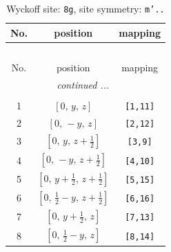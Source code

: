 \documentclass[fleqn,8pt]{jsarticle}
\begin{document}
\begin{longtable}{ccc}
\caption{Wyckoff site: {\tt 8g}, site symmetry: {\tt m'..}}
 \\
 \hline \hline
No. & position & mapping \\ \hline \endfirsthead

\multicolumn{2}{l}{\tablename\ \thetable{}} \\
 \hline \hline
No. & position & mapping \\ \hline \endhead

 \hline \hline
\multicolumn{2}{r}{\footnotesize\it continued ...} \\ \endfoot

 \hline \hline
\multicolumn{2}{r}{} \\ \endlastfoot

1 & $\left[ 0,\, y,\, z \right]$ & {\tt [1,11]} \\ \hline
2 & $\left[ 0,\, - y,\, z \right]$ & {\tt [2,12]} \\ \hline
3 & $\left[ 0,\, y,\, z + \frac{1}{2} \right]$ & {\tt [3,9]} \\ \hline
4 & $\left[ 0,\, - y,\, z + \frac{1}{2} \right]$ & {\tt [4,10]} \\ \hline
5 & $\left[ 0,\, y + \frac{1}{2},\, z + \frac{1}{2} \right]$ & {\tt [5,15]} \\ \hline
6 & $\left[ 0,\, \frac{1}{2} - y,\, z + \frac{1}{2} \right]$ & {\tt [6,16]} \\ \hline
7 & $\left[ 0,\, y + \frac{1}{2},\, z \right]$ & {\tt [7,13]} \\ \hline
8 & $\left[ 0,\, \frac{1}{2} - y,\, z \right]$ & {\tt [8,14]} \\
\end{longtable}
\renewcommand{\arraystretch}{1.2}
\end{document}
